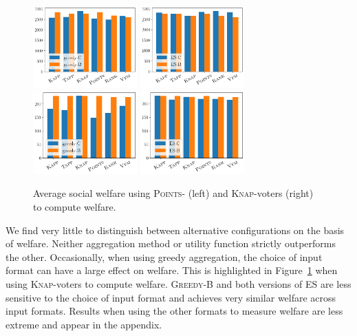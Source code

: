 \documentclass[mnsc,blindrev]{informs3_freeuse} %
\newcommand{\kibitz}[2]{\ifnum\Comments=1{\color{#1}{#2}}\fi}
\newcommand{\gb}[1]{\kibitz{red}{[GB:#1]}}
\newcommand{\points}{\textsc{Points}}
\newcommand{\knap}{\textsc{Knap}}
\newcommand{\bingreedy}{\textsc{Greedy-B}}
\begin{document}
\begin{figure}[htb]
\begin{center}
\includegraphics[width=4cm]{experiment/Utilities_greedy.png}
\includegraphics[width=4cm]{experiment/Utilities_ES.png}
\includegraphics[width=4cm]{experiment/Knapsack_greedy.png}
\includegraphics[width=4cm]{experiment/Knapsack_ES.png}

\caption{Average social welfare     using   \points- (left) and \knap-voters (right) to compute welfare. 
}\label{fig:exp:welfare}
\end{center}\vspace{-5mm}
\end{figure}

We find very little to distinguish between alternative configurations on the basis of welfare. Neither     aggregation method or utility function  strictly outperforms the other. Occasionally, when using greedy aggregation, the choice of input format can have a large effect on welfare. This is highlighted in Figure~\ref{fig:exp:welfare} when using \knap-voters to compute welfare. \bingreedy{} and both versions of ES  are less sensitive to  the choice of input format and   achieves very similar welfare across input formats.
Results when using the other formats to measure welfare are less extreme and appear in the appendix.\gb{appendix}
\end{document}
